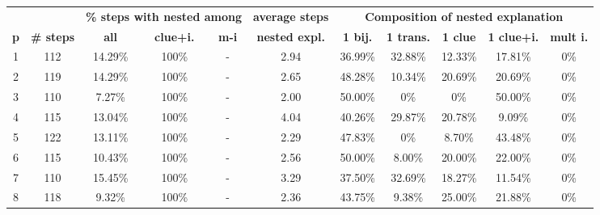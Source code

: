 

\begin{table}[t]
	\centering
	\begin{tabular}{c|c|ccc|c|ccccc}
		& &  \multicolumn{3}{c|}{\textbf{\% steps with nested among}} & \multicolumn{1}{c|}{\textbf{average steps}} & \multicolumn{5}{c}{\textbf{Composition of nested explanation }}\\
		\textbf{p} & \textbf{\# steps } & \textbf{all}     & \textbf{clue+i.} & \textbf{m-i}          & \textbf{nested expl.} & \textbf{1 bij.} & \textbf{1 trans.} & \textbf{1 clue} & \textbf{1 clue+i.} & \textbf{mult i.} \\ \hline
		1 &      112 &  14.29\% &  100\% &  - &         2.94 &  36.99\% &   32.88\% &  12.33\% &    17.81\% &    0\% \\
		2 &      119 &  14.29\% &  100\% &  - &         2.65 &  48.28\% &   10.34\% &  20.69\% &    20.69\% &    0\% \\
		3 &      110 &   7.27\% &  100\% &  - &         2.00 &  50.00\% &    0\% &   0\% &    50.00\% &    0\% \\
		4 &      115 &  13.04\% &  100\% &  - &         4.04 &  40.26\% &   29.87\% &  20.78\% &     9.09\% &    0\% \\
		5 &      122 &  13.11\% &  100\% &  - &         2.29 &  47.83\% &    0\% &   8.70\% &    43.48\% &    0\% \\
		6 &      115 &  10.43\% &  100\% &  - &         2.56 &  50.00\% &    8.00\% &  20.00\% &    22.00\% &    0\% \\
		7 &      110 &  15.45\% &  100\% &  - &         3.29 &  37.50\% &   32.69\% &  18.27\% &    11.54\% &    0\% \\
		8 &      118 &   9.32\% &  100\% &  - &         2.36 &  43.75\% &    9.38\% &  25.00\% &    21.88\% &    0\% \\

\end{tabular}
\end{table}
